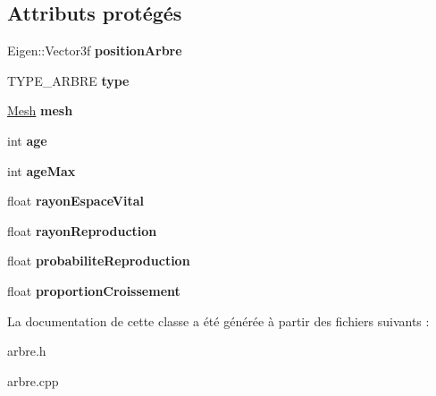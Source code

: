 \subsection*{Attributs protégés}
\begin{DoxyCompactItemize}
\item 
\hypertarget{class_arbre_a6c16244627edc5cdfaf3b78ef59b5d45}{}Eigen\+::\+Vector3f {\bfseries position\+Arbre}\label{class_arbre_a6c16244627edc5cdfaf3b78ef59b5d45}

\item 
\hypertarget{class_arbre_a5bd1059a3269bee31e36557bc252d8c9}{}T\+Y\+P\+E\+\_\+\+A\+R\+B\+R\+E {\bfseries type}\label{class_arbre_a5bd1059a3269bee31e36557bc252d8c9}

\item 
\hypertarget{class_arbre_a93ec9701faed238f11c5e5d2a2effead}{}\hyperlink{class_mesh}{Mesh} {\bfseries mesh}\label{class_arbre_a93ec9701faed238f11c5e5d2a2effead}

\item 
\hypertarget{class_arbre_a8f97533abffdbab609de97b3c882be1a}{}int {\bfseries age}\label{class_arbre_a8f97533abffdbab609de97b3c882be1a}

\item 
\hypertarget{class_arbre_a6cfbbb43ad9657502eb11f097da16970}{}int {\bfseries age\+Max}\label{class_arbre_a6cfbbb43ad9657502eb11f097da16970}

\item 
\hypertarget{class_arbre_a2469c0d6206592d8c2c27362b2dc1e5a}{}float {\bfseries rayon\+Espace\+Vital}\label{class_arbre_a2469c0d6206592d8c2c27362b2dc1e5a}

\item 
\hypertarget{class_arbre_aaece9fe72832ba7b63447ef05925179f}{}float {\bfseries rayon\+Reproduction}\label{class_arbre_aaece9fe72832ba7b63447ef05925179f}

\item 
\hypertarget{class_arbre_ac81e6bc50c7380f71ef50f78a8af6043}{}float {\bfseries probabilite\+Reproduction}\label{class_arbre_ac81e6bc50c7380f71ef50f78a8af6043}

\item 
\hypertarget{class_arbre_a09f99a27cb4b5fe27e12fecdfd6e01c4}{}float {\bfseries proportion\+Croissement}\label{class_arbre_a09f99a27cb4b5fe27e12fecdfd6e01c4}

\end{DoxyCompactItemize}


La documentation de cette classe a été générée à partir des fichiers suivants \+:\begin{DoxyCompactItemize}
\item 
arbre.\+h\item 
arbre.\+cpp\end{DoxyCompactItemize}
